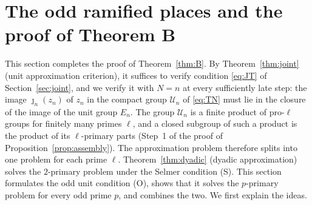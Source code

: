 \documentclass[11pt]{article}
\theoremstyle{plain}
\theoremstyle{definition}
\theoremstyle{remark}
\begin{document}
\section{The odd ramified places and the proof of Theorem B}\label{sec:odd}

This section completes the proof of Theorem~\ref{thm:B}.  By
Theorem~\ref{thm:joint} (unit approximation criterion), it suffices to
verify condition \eqref{eq:JT} of Section~\ref{sec:joint}, and we verify
it with $N=n$ at every sufficiently late step: the image $\jmath_n(z_n)$
of $z_n$ in the compact group $\mathcal U_n$ of \eqref{eq:TN} must lie in
the closure of the image of the unit group $E_n$.  The group $\mathcal U_n$
is a finite product of pro-$\ell$ groups for finitely many primes $\ell$,
and a closed subgroup of such a product is the product of its
$\ell$-primary parts (Step~1 of the proof of
Proposition~\ref{prop:assembly}).  The approximation problem therefore
splits into one problem for each prime $\ell$.  Theorem~\ref{thm:dyadic}
(dyadic approximation) solves the $2$-primary problem under the Selmer
condition (S).  This section formulates the odd unit condition (O), shows
that it solves the $p$-primary problem for every odd prime $p$, and
combines the two.  We first explain the ideas.
\end{document}
